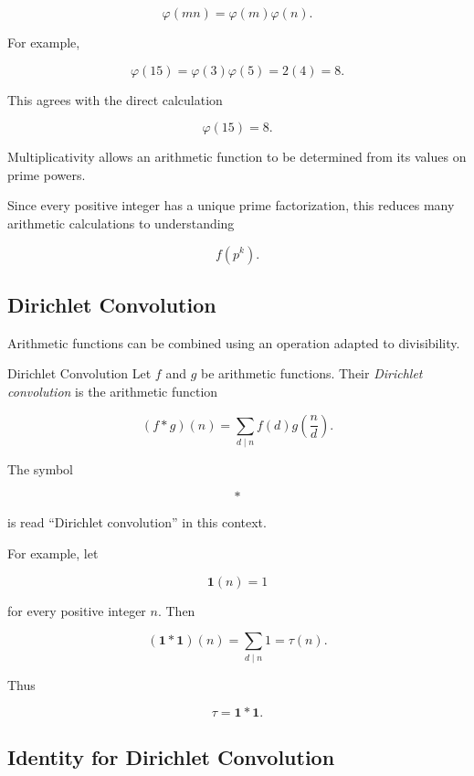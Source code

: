 \[ \varphi(mn)=\varphi(m)\varphi(n). \]

For example,

\[ \varphi(15)=\varphi(3)\varphi(5)=2(4)=8. \]

This agrees with the direct calculation

\[ \varphi(15)=8. \]

\begin{importantbox}
Multiplicativity allows an arithmetic function to be determined from its
values on prime powers.

Since every positive integer has a unique prime factorization, this reduces
many arithmetic calculations to understanding

\[ f(p^k). \]
\end{importantbox}

\subsection{Dirichlet Convolution}
\label{subsec:dirichlet-convolution}

Arithmetic functions can be combined using an operation adapted to
divisibility.

\begin{definitionbox}{Dirichlet Convolution}
Let \(f\) and \(g\) be arithmetic functions. Their \emph{Dirichlet
convolution} is the arithmetic function

\[ (f*g)(n)=\sum_{d\mid n}f(d)g\left(\frac nd\right). \]
\end{definitionbox}

The symbol

\[ * \]

is read ``Dirichlet convolution'' in this context.

For example, let

\[ \mathbf{1}(n)=1 \]

for every positive integer \(n\). Then

\[ (\mathbf{1}*\mathbf{1})(n)=\sum_{d\mid n}1=\tau(n). \]

Thus

\[ \boxed{\tau=\mathbf{1}*\mathbf{1}.} \]

\subsection{Identity for Dirichlet Convolution}
\label{subsec:dirichlet-convolution-identity}

